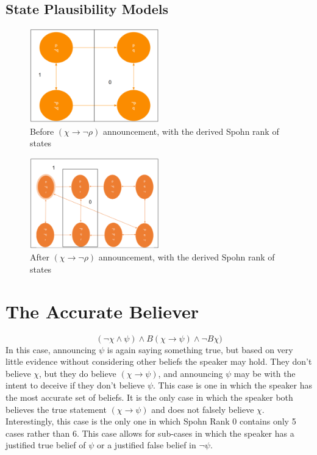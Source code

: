 \documentclass[12pt, titlepage, twoside]{report}
\begin{document}
\subsection{State Plausibility Models}
\quad
\newline
\begin{figure}[h!]
  \centering
  \includegraphics[width=0.5\textwidth]{slide30.eps}
  \caption{Before $(\chi \to \neg \rho)$ announcement, with the derived Spohn rank of states}
\end{figure}
\begin{figure}[h!]
  \centering
  \includegraphics[width=0.5\textwidth]{slide32.eps}
  \caption{After $(\chi \to \neg \rho)$ announcement, with the derived Spohn rank of states}
\end{figure}
\quad
\newline

\section{The Accurate Believer}
$$(\neg \chi \wedge \psi) \wedge B(\chi \to \psi) \wedge \neg B \chi)$$
In this case, announcing $\psi$ is again saying something true, but based on very little evidence without considering other beliefs the speaker may hold. They don’t believe $\chi$, but they do believe $(\chi \to \psi)$, and announcing $\psi$ may be with the intent to deceive if they don’t believe $\psi$. This case is one in which the speaker has the most accurate set of beliefs. It is the only case in which the speaker both believes the true statement $(\chi \to \psi)$ and does not falsely believe $\chi$. Interestingly, this case is the only one in which Spohn Rank 0 contains only 5 cases rather than 6. This case allows for sub-cases in which the speaker has a justified true belief of $\psi$ or a justified false belief in $\neg \psi$.
\end{document}
